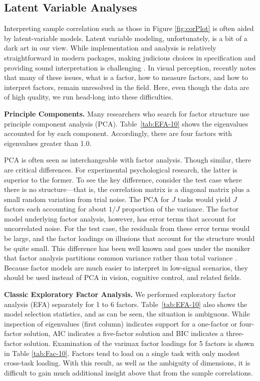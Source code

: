 \subsection{Latent Variable Analyses}

Interpreting sample correlation such as those in Figure \ref{fig:corPlot} is often aided by latent-variable models.   Latent variable modeling, unfortunately, is a bit of a dark art in our view.  While implementation and analysis is relatively straightforward in modern packages, making judicious choices in specification and providing sound interpretation is challenging \parencite[]{Preacher.MacCallum.2003, Armstrong.1967}.  In visual perception, \textcite{Tulver.2019} recently notes that many of these issues, what is a factor, how to measure factors, and how to interpret factors, remain unresolved in the field.  Here, even though the data are of high quality, we run head-long into these difficulties. 



\textbf{Principle Components.}  Many researchers who search for factor structure use principle component analysis (PCA).   Table~\ref{tab:EFA-10} shows the eigenvalues accounted for by each component. Accordingly, there are four factors with eigenvalues greater than 1.0. 

PCA is often seen as interchangeable with factor analysis.  Though similar, there are critical differences.  For experimental psychological research, the latter is superior to the former.  To see the key difference, consider the test case where there is no structure---that is, the correlation matrix is a diagonal matrix plus a small random variation from trial noise.  The PCA for $J$ tasks would yield $J$ factors each accounting for about $1/J$ proportion of the variance.   The factor model underlying factor analysis, however, has error terms that account for uncorrelated noise.  For the test case, the residuals from these error terms would be large, and the factor loadings on illusions that account for the structure would be quite small.  This difference has been well known \parencite[]{Velicer.Jackson.1990} and goes under the moniker that factor analysis partitions common variance rather than total variance \parencite[]{Kline.2023}.  Because factor models are much easier to interpret in low-signal scenarios, they should be used instead of PCA in vision, cognitive control, and related fields.

{\bf Classic Exploratory Factor Analysis.}  We performed exploratory factor analysis (EFA) separately for 1 to 6 factors.  Table~\ref{tab:EFA-10} also shows the model selection statistics, and as can be seen, the situation is ambiguous.  While inspection of eigenvalues (first column) indicates support for a one-factor or four-factor solution, AIC indicates a five-factor solution and BIC indicates a three-factor solution.  Examination of the varimax factor loadings for 5 factors is shown in Table \ref{tab:Fac-10}. Factors tend to load on a single task with only modest cross-task loading.  With this result, as well as the ambiguity of dimensions, it is difficult to gain much additional insight above that from the sample correlations.  

